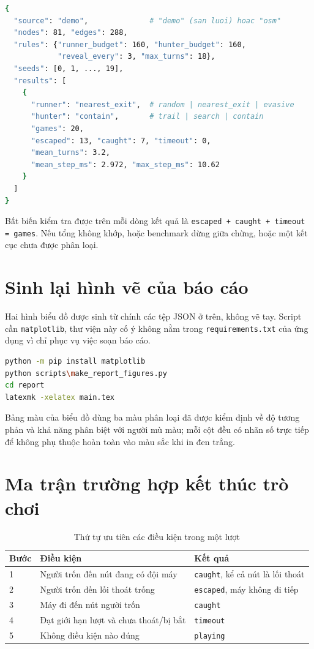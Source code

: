 \begin{lstlisting}[language=bash,caption={Lược đồ \texttt{output/chase/benchmark-*.json}}]
{
  "source": "demo",              # "demo" (san luoi) hoac "osm"
  "nodes": 81, "edges": 288,
  "rules": {"runner_budget": 160, "hunter_budget": 160,
            "reveal_every": 3, "max_turns": 18},
  "seeds": [0, 1, ..., 19],
  "results": [
    {
      "runner": "nearest_exit",  # random | nearest_exit | evasive
      "hunter": "contain",       # trail | search | contain
      "games": 20,
      "escaped": 13, "caught": 7, "timeout": 0,
      "mean_turns": 3.2,
      "mean_step_ms": 2.972, "max_step_ms": 10.62
    }
  ]
}
\end{lstlisting}

Bất biến kiểm tra được trên mỗi dòng kết quả là
\texttt{escaped + caught + timeout = games}. Nếu tổng không khớp, hoặc benchmark
dừng giữa chừng, hoặc một kết cục chưa được phân loại.

\section{Sinh lại hình vẽ của báo cáo}

Hai hình biểu đồ được sinh từ chính các tệp JSON ở trên, không vẽ tay. Script cần
\texttt{matplotlib}, thư viện này cố ý không nằm trong \texttt{requirements.txt}
của ứng dụng vì chỉ phục vụ việc soạn báo cáo.

\begin{lstlisting}[language=bash,caption={Sinh lại hình và biên dịch báo cáo}]
python -m pip install matplotlib
python scripts\make_report_figures.py
cd report
latexmk -xelatex main.tex
\end{lstlisting}

Bảng màu của biểu đồ dùng ba màu phân loại đã được kiểm định về độ tương phản và
khả năng phân biệt với người mù màu; mỗi cột đều có nhãn số trực tiếp để không
phụ thuộc hoàn toàn vào màu sắc khi in đen trắng.

\section{Ma trận trường hợp kết thúc trò chơi}

\begin{table}[H]
\centering
\caption{Thứ tự ưu tiên các điều kiện trong một lượt}
\begin{tabularx}{\linewidth}{p{1.2cm}Y Y}
\toprule
\textbf{Bước} & \textbf{Điều kiện} & \textbf{Kết quả} \\
 & Người trốn đến nút đang có đội máy & \texttt{caught}, kể cả nút là lối thoát \\
2 & Người trốn đến lối thoát trống & \texttt{escaped}, máy không đi tiếp \\
3 & Máy đi đến nút người trốn & \texttt{caught} \\
4 & Đạt giới hạn lượt và chưa thoát/bị bắt & \texttt{timeout} \\
5 & Không điều kiện nào đúng & \texttt{playing} \\
\bottomrule
\end{tabularx}
\end{table}

